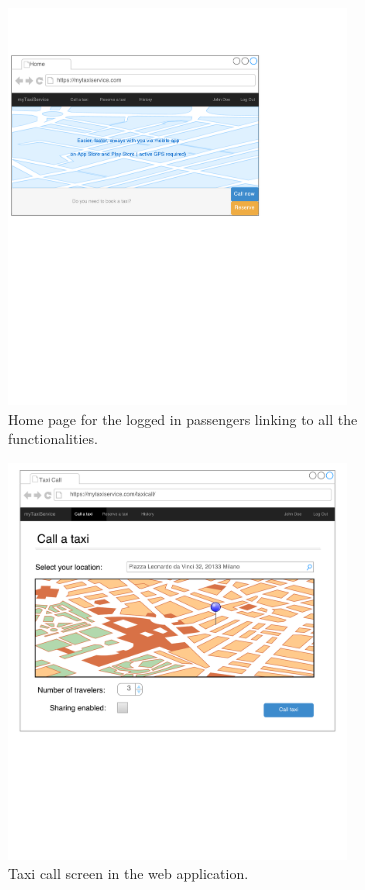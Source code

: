 \begin{figure}[h]
\centering
\includegraphics[width=0.8\textwidth]{mockup/web/UserHome}
\caption{Home page for the logged in passengers linking to all the functionalities.}
\label{fig:mockup-userhome}
\end{figure}

\begin{figure}[h]
\centering
\includegraphics[width=0.8\textwidth]{mockup/web/TaxiCallBrowser}
\caption{Taxi call screen in the web application.}
\label{fig:mockup-taxicall-browser}
\end{figure}

